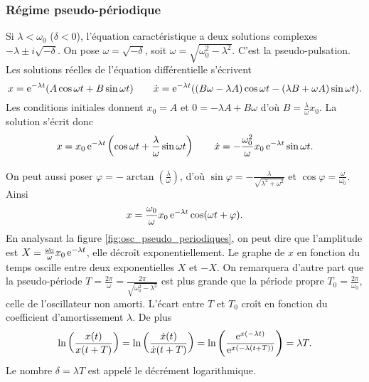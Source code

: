\subsubsection{Régime pseudo-périodique}%
\label{chap5-subsubsec:pseudoperiodique}%

Si \(\lambda < \omega_0\) (\(\delta < 0\)), l'équation caractéristique a deux
solutions complexes \(-\lambda \pm i\sqrt{-\delta}\). On pose \(\omega =
\sqrt{-\delta}\), soit \(\omega = \sqrt{\omega_0^2-\lambda^2}\). C'est la
pseudo-pulsation. Les solutions réelles de l'équation différentielle s'écrivent
\begin{equation}%
  x = \e^{-\lambda t}(A\cos\omega t + B\sin\omega t) \qquad \dot x =
  \e^{-\lambda t}((B\omega -\lambda A)\cos\omega t - (\lambda B + \omega
  A)\sin\omega t).
\end{equation}%
Les conditions initiales donnent \(x_0=A\) et \(0 = -\lambda A + B \omega\)
d'où \(B = \frac{\lambda}{\omega}x_0\). La solution s'écrit donc
\begin{equation}%
  x = x_0 \e^{-\lambda t}\left(\cos \omega t + \frac{\lambda}{\omega}\sin\omega
  t\right) \qquad \dot x = -\frac{\omega_0^2}{\omega}x_0 \e^{-\lambda t}\sin
  \omega t.
\end{equation}%

On peut aussi poser \(\varphi = -\arctan\left(\frac{\lambda}{\omega}\right)\),
d'où \(\sin\varphi = -\frac{\lambda}{\sqrt{\lambda^2+\omega^2}}\) et
\(\cos\varphi = \frac{\omega}{\omega_0}\). Ainsi
\begin{equation}%
  x = \frac{\omega_0}{\omega}x_0 \e^{-\lambda t} \cos(\omega t + \varphi).
\end{equation}%
%
En analysant la figure \ref{fig:osc_pseudo_periodiques}, on peut dire que
l'amplitude est \(X = \frac{\omega_0}{\omega}x_0 \operatorname{e}^{-\lambda
t}\), elle décroît exponentiellement. Le graphe de \(x\) en fonction du temps
oscille entre deux exponentielles \(X\) et \(-X\). On remarquera d'autre part
que la pseudo-période \(T = \frac{2\pi}{\omega} =
\frac{2\pi}{\sqrt{\omega_0^2-\lambda^2}}\) est plus grande que la période
propre \(T_0 = \frac{2\pi}{\omega_0}\), celle de l'oscillateur non amorti.
L'écart entre \(T\) et \(T_0\) croît en fonction du coefficient d'amortissement
\(\lambda\). De plus
\begin{equation}%
  \ln\left(\frac{x(t)}{x(t+T)}\right) = \ln\left(\frac{\dot x(t)}{\dot
  x(t+T)}\right) = \ln\left(\frac{\e^{x(-\lambda t)}}{\e^{x(-\lambda
  (t+T))}}\right) = \lambda T.
\end{equation}%
Le nombre \(\delta = \lambda T\) est appelé le décrément logarithmique.

